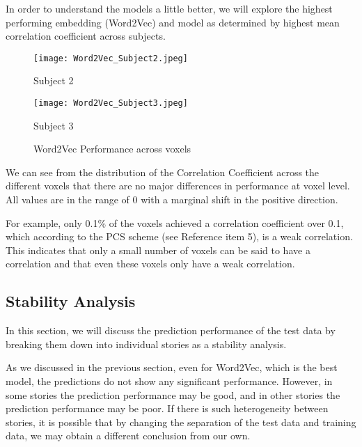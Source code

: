 \documentclass[12pt,letterpaper]{article}
\begin{document}
In order to understand the models a little better, we will explore the highest performing embedding (Word2Vec) and model as determined by highest mean correlation coefficient across subjects. 

\begin{figure}[H]
    \centering
    \begin{minipage}{0.45\textwidth}
        \centering
        \texttt{[image: Word2Vec\_Subject2.jpeg]}
        \caption{Subject 2}
        \label{fig:word2vec_subject2}
    \end{minipage}
    \hfill
    \begin{minipage}{0.45\textwidth}
        \centering
        \texttt{[image: Word2Vec\_Subject3.jpeg]}
        \caption{Subject 3}
        \label{fig:zweitest_bild}
    \end{minipage}
    \caption{Word2Vec Performance across voxels}
    \label{fig:word2vec_subject3}
\end{figure}

We can see from the distribution of the Correlation Coefficient across the different voxels that there are no major differences in performance at voxel level. All values are in the range of 0 with a marginal shift in the positive direction.

For example, only 0.1\% of the voxels achieved a correlation coefficient over 0.1, which according to the PCS scheme (see Reference item 5), is a weak correlation. This indicates that only a small number of voxels can be said to have a correlation and that even these voxels only have a weak correlation.

\subsection{Stability Analysis}

In this section, we will discuss the prediction performance of the test data by breaking them down into individual stories as a stability analysis.

As we discussed in the previous section, even for Word2Vec, which is the best model, the predictions do not show any significant performance. However, in some stories the prediction performance may be good, and in other stories the prediction performance may be poor. If there is such heterogeneity between stories, it is possible that by changing the separation of the test data and training data, we may obtain a different conclusion from our own.
\end{document}
